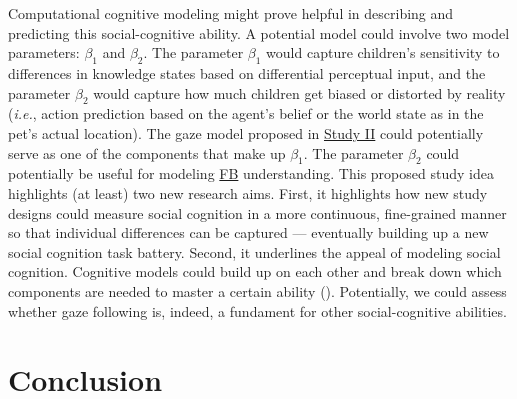 \documentclass[
]{scrbook}
\begin{document}
Computational cognitive modeling might prove helpful in describing and predicting this social-cognitive ability. A potential model could involve two model parameters: \(\beta_1\) and \(\beta_2\). The parameter \(\beta_1\) would capture children's sensitivity to differences in knowledge states based on differential perceptual input, and the parameter \(\beta_2\) would capture how much children get biased or distorted by reality (\emph{i.e.}, action prediction based on the agent's belief or the world state as in the pet's actual location). The gaze model proposed in \hyperref[studyII]{Study II} could potentially serve as one of the components that make up \(\beta_1\). The parameter \(\beta_2\) could potentially be useful for modeling \hyperref[acronyms_FB]{FB} understanding. This proposed study idea highlights (at least) two new research aims. First, it highlights how new study designs could measure social cognition in a more continuous, fine-grained manner so that individual differences can be captured --- eventually building up a new social cognition task battery. Second, it underlines the appeal of modeling social cognition. Cognitive models could build up on each other and break down which components are needed to master a certain ability (). Potentially, we could assess whether gaze following is, indeed, a fundament for other social-cognitive abilities.

\newpage

\section{Conclusion}\label{conclusion}
\end{document}
